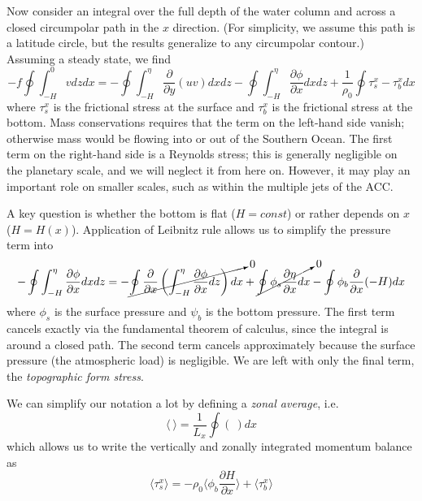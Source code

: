 \documentclass[12pt]{article}
\newcommand{\pd}[2]{ \frac{\partial #1}{\partial #2} }
\newcommand{\ab}[1]{\ensuremath{\langle #1 \rangle}}
\begin{document}
Now consider an integral over the full depth of the water column and across a closed circumpolar path in the $x$ direction. (For simplicity, we assume this path is a latitude circle, but the results generalize to any circumpolar contour.) Assuming a steady state, we find
\begin{equation}
- f \oint \int_{-H}^0 v dz dx = -\oint \int_{-H}^\eta \pd{}{y}(uv) dx dz - \oint \int_{-H}^\eta \pd{\phi}{x} dx dz + \frac{1}{\rho_0}\oint \tau^x_s - \tau^x_b dx
\end{equation}
where $\tau^x_s$ is the frictional stress at the surface and $\tau^x_b$ is the frictional stress at the bottom.
Mass conservations requires that the term on the left-hand side vanish; otherwise mass would be flowing into or out of the Southern Ocean. The first term on the right-hand side is a Reynolds stress; this is generally negligible on the planetary scale, and we will neglect it from here on. However, it may play an important role on smaller scales, such as within the multiple jets of the ACC.

A key question is whether the bottom is flat ($H = const$) or rather depends on $x$ ($H = H(x)$). Application of Leibnitz rule allows us to simplify the pressure term into
\begin{equation}
-\oint \int_{-H}^\eta \pd{\phi}{x} dx dz = -\cancelto{0}{\oint \pd{}{x} \left ( \int_{-H}^\eta \pd{\phi}{x} dz \right ) dx} + \cancelto{0}{\oint \phi_s \pd{\eta}{x} dx} - \oint \phi_b \pd{}{x}(-H)dx 
\end{equation}
where $\phi_s$ is the surface pressure and $\psi_b$ is the bottom pressure. The first term cancels exactly via the fundamental theorem of calculus, since the integral is around a closed path. The second term cancels approximately because the surface pressure (the atmospheric load) is negligible. We are left with only the final term, the {\em topographic form stress}.

We can simplify our notation a lot by defining a {\em zonal average}, i.e.
\begin{equation}
\ab{ \ } = \frac{1}{L_x} \oint ( \ ) dx
\end{equation}
which allows us to write the vertically and zonally integrated momentum balance as
\begin{equation}
\ab{\tau^x_s} = - \rho_0 \ab{\phi_b \pd{H}{x}} + \ab{\tau^x_b}
\label{eq:mom}
\end{equation}
\end{document}
